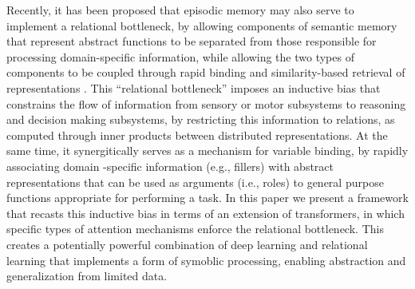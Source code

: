 Recently, it has been proposed that episodic memory may also serve to implement a relational bottleneck,
by allowing components of semantic memory that represent abstract functions to be separated from those
responsible for processing domain-specific information, while allowing the two types of components to be coupled
through rapid binding and similarity-based retrieval of representations \citep{esbn}.
This ``relational bottleneck'' imposes an inductive bias that constrains the flow of information from sensory or
motor subsystems to reasoning and decision making subsystems, by restricting this information to relations, as
computed through inner products between distributed representations.
At the same time, it synergitically serves as a mechanism for variable binding, by rapidly associating domain
-specific information (e.g., fillers) with abstract representations that can be used as arguments (i.e., roles)
to general purpose functions appropriate for performing a task.
In this paper we present a framework that recasts this inductive bias in terms of an extension of transformers, in
which specific types of attention mechanisms enforce the relational bottleneck. This creates a potentially powerful
combination of deep learning and relational learning that implements a form of symoblic processing, enabling
abstraction and generalization from limited data.

